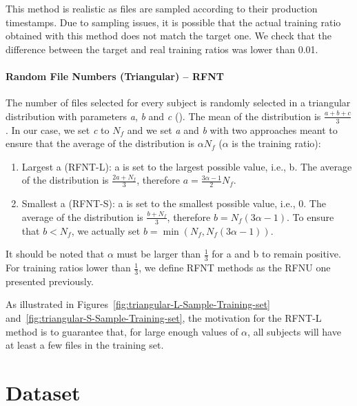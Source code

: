 \documentclass[10pt, conference, compsocconf]{IEEEtran}
\newcommand{\todo}[1]{\marginpar{\parbox{18mm}{\flushleft\tiny\color{red}\textbf{TODO}:
      #1}}}
\begin{document}
This method is realistic as files are sampled according to their production timestamps.
Due to sampling issues, it is possible that the actual training ratio obtained with this method
does not match the target one. We check that the difference between the target and real training ratios
was lower than 0.01.\\ 

\paragraph{Random File Numbers (Triangular) -- RFNT}
The number of files selected for every subject is randomly selected in
a triangular distribution with parameters \textit{a}, \textit{b} and 
\textit{c} (\todo{see Figure X}). The mean of the distribution is 
$\frac{a+b+c}{3}$. In our case, we set \textit{c} to $N_{f}$ and we set 
\textit{a} and \textit{b} with two approaches meant to ensure that the 
average of the distribution is $\alpha N_{f}$ ($\alpha$ is the training 
ratio):
\begin{enumerate}
        \item Largest a (RFNT-L): a is set to the 
        largest possible value, i.e., b. The average of the 
        distribution is $\frac{2a+N_{f}}{3}$, therefore 
        $a=\frac{3\alpha-1}{2}N_{f}$.
                \item Smallest a (RFNT-S): a is 
        set to the smallest possible value, i.e., 0. The average of the 
        distribution is $\frac{b+N_{f}}{3}$, therefore 
        $b=N_{f}(3\alpha-1)$. To ensure that $b<N_{f}$, we actually set 
        $b=\min(N_{f}, N_{f}(3\alpha-1))$. 
\end{enumerate}
It should be noted that $\alpha$ must be larger than $\frac{1}{3}$ for 
a and b to remain positive. For training ratios lower than $\frac{1}{3}$, we 
define RFNT methods as the RFNU one presented previously.

As illustrated in Figures~\ref{fig:triangular-L-Sample-Training-set} 
and~\ref{fig:triangular-S-Sample-Training-set}, the motivation for the 
RFNT-L method is to guarantee that, for large enough values of 
$\alpha$, all subjects will have at least a few files in the training 
set.

\section{Dataset}
\end{document}
